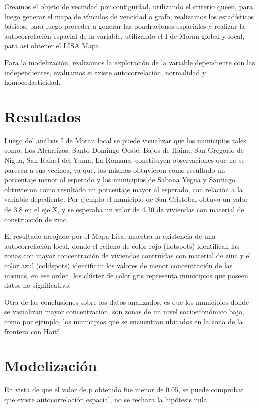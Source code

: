 \documentclass[11pt,]{article}
\begin{document}
Creamos el objeto de vecindad por contigüidad, utilizando el criterio
queen, para luego generar el mapa de vínculos de vencidad o grafo,
realizamos los estadísticos básicos, para luego proceder a generar las
pondraciones espaciales y realizar la autocorrelación espacial de la
variable, utilizando el I de Moran global y local, para así obtener el
LISA Mapa.

Para la modelización, realizamos la exploración de la variable
dependiente con las independientes, evaluamos si existe autocorrelación,
normalidad y homocedasticidad.

\section{Resultados}\label{resultados}

Luego del análisis I de Moran local se puede visualizar que los
municipios tales como: Los Alcarrizos, Santo Domingo Oeste, Bajos de
Haina, San Gregorio de Nigua, San Rafael del Yuma, La Romana,
constituyen observaciones que no se parecen a sus vecinos, ya que, los
mismos obtuvieron como resultado un porcentaje menor al esperado y los
municipios de Sabana Yegua y Santiago obtuvieron como resultado un
porcentaje mayor al esperado, con relación a la variable depediente. Por
ejemplo el municipio de San Cristóbal obtuvo un valor de 3.8 en el eje
X, y se esperaba un valor de 4.30 de viviendas con material de
construcción de zinc.

El resultado arrojado por el Mapa Lisa, muestra la existencia de una
autocorrelación local, donde el relleno de color rojo (hotspots)
identifican las zonas con mayor concentración de viviendas contruídas
con material de zinc y el color azul (coldspots) identifican los valores
de menor concentración de las mismas, en ese orden, los clúster de color
gris representa municipios que poseen datos no significativo.

Otra de las conclusiones sobre los datos analizados, es que los
municipios donde se visualizan mayor concentración, son zonas de un
nivel socioeconómico bajo, como por ejemplo, los municipios que se
encuentran ubicados en la zona de la frontera con Haití.

\section{Modelización}\label{modelizaciuxf3n}

En vista de que el valor de p obtenido fue menor de 0.05, se puede
comprobar que existe autocorrelación espacial, no se rechaza la
hipótesis nula.
\end{document}
